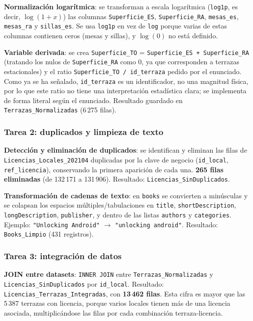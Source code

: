 \documentclass[11pt]{article}
\begin{document}
\textbf{Normalización logarítmica}: se transforman a escala logarítmica
(\texttt{log1p}, es decir, $\log(1+x)$) las columnas \texttt{Superficie\_ES},
\texttt{Superficie\_RA}, \texttt{mesas\_es}, \texttt{mesas\_ra} y \texttt{sillas\_es}. Se
usa \texttt{log1p} en vez de \texttt{log} porque varias de estas columnas contienen ceros
(mesas y sillas), y $\log(0)$ no está definido.

\textbf{Variable derivada}: se crea \texttt{Superficie\_TO} = \texttt{Superficie\_ES +
Superficie\_RA} (tratando los nulos de \texttt{Superficie\_RA} como 0, ya que corresponden
a terrazas estacionales) y el ratio \texttt{Superficie\_TO / id\_terraza} pedido por el
enunciado. Como ya se ha señalado, \texttt{id\_terraza} es un identificador, no una
magnitud física, por lo que este ratio no tiene una interpretación estadística clara; se
implementa de forma literal según el enunciado. Resultado guardado en
\texttt{Terrazas\_Normalizadas} (6\,275 filas).

\subsubsection{Tarea 2: duplicados y limpieza de texto}

\textbf{Detección y eliminación de duplicados}: se identifican y eliminan las filas de
\texttt{Licencias\_Locales\_202104} duplicadas por la clave de negocio (\texttt{id\_local},
\texttt{ref\_licencia}), conservando la primera aparición de cada una.
\textbf{265 filas eliminadas} (de 132\,171 a 131\,906). Resultado:
\texttt{Licencias\_SinDuplicados}.

\textbf{Transformación de cadenas de texto}: en \texttt{books} se convierten a minúsculas
y se colapsan los espacios múltiples/tabulaciones en \texttt{title},
\texttt{shortDescription}, \texttt{longDescription}, \texttt{publisher}, y dentro de las
listas \texttt{authors} y \texttt{categories}. Ejemplo: \texttt{"Unlocking Android"} $\to$
\texttt{"unlocking android"}. Resultado: \texttt{Books\_Limpio} (431 registros).

\subsubsection{Tarea 3: integración de datos}

\textbf{JOIN entre datasets}: \texttt{INNER JOIN} entre \texttt{Terrazas\_Normalizadas} y
\texttt{Licencias\_SinDuplicados} por \texttt{id\_local}. Resultado:
\texttt{Licencias\_Terrazas\_Integradas}, con \textbf{13\,462 filas}. Esta cifra es mayor
que las 5\,387 terrazas con licencia, porque varios locales tienen más de una licencia
asociada, multiplicándose las filas por cada combinación terraza-licencia.
\end{document}
